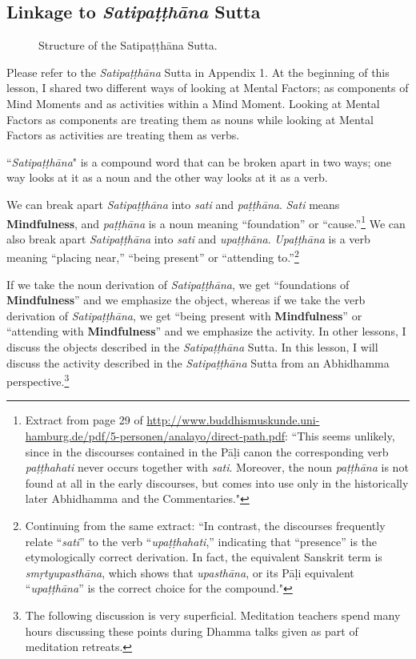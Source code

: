 \subsection*{Linkage to \textit{Satipaṭṭhāna} Sutta}

\begin{figure}[H]
\centering

\caption{Structure of the Satipaṭṭhāna Sutta.}
\label{fig:Sati}
\end{figure}

Please refer to the \textit{Satipaṭṭhāna} Sutta in Appendix 1. At the beginning of this lesson, I shared two different ways of looking at Mental Factors; as components of Mind Moments and as activities within a Mind Moment. Looking at Mental Factors as components are treating them as nouns while looking at Mental Factors as activities are treating them as verbs.

``\textit{Satipaṭṭhāna}" is a compound word that can be broken apart in two ways; one way looks at it as a noun and the other way looks at it as a verb.

\pagebreak

We can break apart \textit{Satipaṭṭhāna} into \textit{sati} and \textit{paṭṭhāna}. \textit{Sati} means \textbf{Mindfulness}, and \textit{paṭṭhāna} is a noun meaning “foundation” or “cause.”\footnote{Extract from page 29 of \url{http://www.buddhismuskunde.uni-hamburg.de/pdf/5-personen/analayo/direct-path.pdf}: “This seems unlikely, since in the discourses contained in the Pāḷi canon the corresponding verb \textit{paṭṭhahati} never occurs together with \textit{sati}. Moreover, the noun \textit{paṭṭhāna} is not found at all in the early discourses, but comes into use only in the historically later Abhidhamma and the Commentaries."} We can also break apart \textit{Satipaṭṭhāna} into \textit{sati} and \textit{upaṭṭhāna}. \textit{Upaṭṭhāna} is a verb meaning “placing near,” “being present” or “attending to.”\footnote{Continuing from the same extract: “In contrast, the discourses frequently relate “\textit{sati}” to the verb “\textit{upaṭṭhahati},” indicating that “presence” is the etymologically correct derivation. In fact, the equivalent Sanskrit term is \textit{smṛtyupasthāna}, which shows that \textit{upasthāna}, or its Pāḷi equivalent “\textit{upaṭṭhāna}” is the correct choice for the compound."}

If we take the noun derivation of \textit{Satipaṭṭhāna}, we get “foundations of \textbf{Mindfulness}” and we emphasize the object, whereas if we take the verb derivation of \textit{Satipaṭṭhāna}, we get “being present with \textbf{Mindfulness}” or “attending with \textbf{Mindfulness}” and we emphasize the activity. In other lessons, I discuss the objects described in the \textit{Satipaṭṭhāna} Sutta. In this lesson, I will discuss the activity described in the \textit{Satipaṭṭhāna} Sutta from an Abhidhamma perspective.\footnote{The following discussion is very superficial. Meditation teachers spend many hours discussing these points during Dhamma talks given as part of meditation retreats.}

